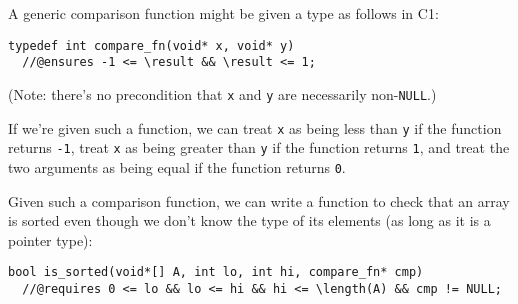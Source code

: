 
\clearpage
{}

A generic comparison function might be given a type as follows in C1:
\begin{lstlisting}[numbers=none]
typedef int compare_fn(void* x, void* y)
  //@ensures -1 <= \result && \result <= 1;
\end{lstlisting}
(Note: there's no precondition that \lstinline'x'
and \lstinline'y' are necessarily non-\lstinline'NULL'.)

If we're given such a function, we can treat \lstinline'x' as being less than
\lstinline'y' if the function returns \lstinline'-1', treat \lstinline'x' as
being greater than \lstinline'y' if the function returns \lstinline'1', and
treat the two arguments as being equal if the function returns \lstinline'0'.

Given such a comparison function, we can write a function to check
that an array is sorted even though we don't know the type of its
elements (as long as it is a pointer type):
\begin{lstlisting}[numbers=none]
bool is_sorted(void*[] A, int lo, int hi, compare_fn* cmp)
  //@requires 0 <= lo && lo <= hi && hi <= \length(A) && cmp != NULL;
\end{lstlisting}

